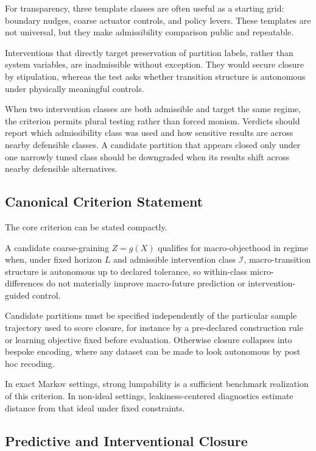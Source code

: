 For transparency, three template classes are often useful as a starting
grid: boundary nudges, coarse actuator controls, and policy levers.
These templates are not universal, but they make admissibility
comparison public and repeatable.

Interventions that directly target preservation of partition labels,
rather than system variables, are inadmissible without exception. They
would secure closure by stipulation, whereas the test asks whether
transition structure is autonomous under physically meaningful controls.

When two intervention classes are both admissible and target the same
regime, the criterion permits plural testing rather than forced monism.
Verdicts should report which admissibility class was used and how
sensitive results are across nearby defensible classes. A candidate partition that appears closed only under one narrowly tuned
class should be downgraded when its results shift across nearby
defensible alternatives.

\subsection{Canonical Criterion
	Statement}\label{canonical-criterion-statement}

The core criterion can be stated compactly.

A candidate coarse-graining \(Z=g(X)\) qualifies for macro-objecthood in
regime when, under fixed horizon \(L\) and admissible intervention class
\(\mathcal{I}\), macro-transition structure is autonomous up to declared
tolerance, so within-class micro-differences do not materially improve
macro-future prediction or intervention-guided control.

Candidate partitions must be specified independently of the particular
sample trajectory used to score closure, for instance by a pre-declared
construction rule or learning objective fixed before evaluation.
Otherwise closure collapses into bespoke encoding, where any dataset can
be made to look autonomous by post hoc recoding.

In exact Markov settings, strong lumpability is a sufficient benchmark
realization of this criterion. In non-ideal settings, leakiness-centered
diagnostics estimate distance from that ideal under fixed constraints.

\subsection{Predictive and Interventional
	Closure}\label{predictive-and-interventional-closure}

